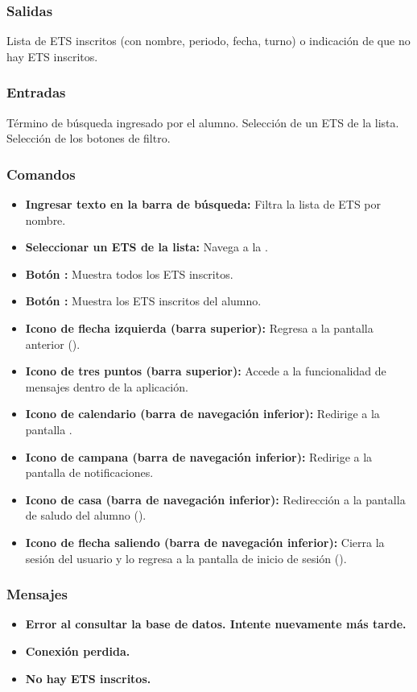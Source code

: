 \subsubsection{Salidas}
Lista de ETS inscritos (con nombre, periodo, fecha, turno) o indicación de que no hay ETS inscritos.

\subsubsection{Entradas}
Término de búsqueda ingresado por el alumno. Selección de un ETS de la lista. Selección de los botones de filtro.

\subsubsection{Comandos}
\begin{itemize}
	\item \textbf{Ingresar texto en la barra de búsqueda:} Filtra la lista de ETS por nombre.
	\item \textbf{Seleccionar un ETS de la lista:} Navega a la .
	\item \textbf{Botón :} Muestra todos los ETS inscritos.
	\item \textbf{Botón :} Muestra los ETS inscritos del alumno.
	\item \textbf{Icono de flecha izquierda (barra superior):} Regresa a la pantalla anterior ().
	\item \textbf{Icono de tres puntos (barra superior):} Accede a la funcionalidad de mensajes dentro de la aplicación.
	\item \textbf{Icono de calendario (barra de navegación inferior):} Redirige a la pantalla .
	\item \textbf{Icono de campana (barra de navegación inferior):} Redirige a la pantalla de notificaciones.
	\item \textbf{Icono de casa (barra de navegación inferior):} Redirección a la pantalla de saludo del alumno ().
	\item \textbf{Icono de flecha saliendo (barra de navegación inferior):} Cierra la sesión del usuario y lo regresa a la pantalla de inicio de sesión ().
\end{itemize}

\subsubsection{Mensajes}
\begin{itemize}
	\item \textbf{Error al consultar la base de datos. Intente nuevamente más tarde.}
	\item \textbf{Conexión perdida.}
	\item \textbf{No hay ETS inscritos.}
\end{itemize}
